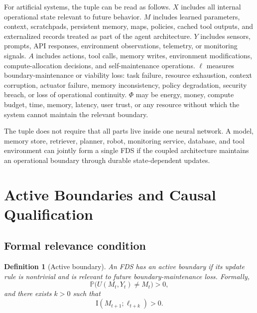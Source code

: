 \documentclass[10pt,a4paper,twocolumn,aps,prl]{revtex4-2}
\newtheorem{definition}{Definition}
\newcommand{\Prob}{\mathbb{P}}
\newcommand{\MI}{\mathrm{I}}
\begin{document}
For artificial systems, the tuple can be read as follows. $X$ includes all internal operational state relevant to future behavior. $M$ includes learned parameters, context, scratchpads, persistent memory, maps, policies, cached tool outputs, and externalized records treated as part of the agent architecture. $Y$ includes sensors, prompts, API responses, environment observations, telemetry, or monitoring signals. $A$ includes actions, tool calls, memory writes, environment modifications, compute-allocation decisions, and self-maintenance operations. $\ell$ measures boundary-maintenance or viability loss: task failure, resource exhaustion, context corruption, actuator failure, memory inconsistency, policy degradation, security breach, or loss of operational continuity. $\Phi$ may be energy, money, compute budget, time, memory, latency, user trust, or any resource without which the system cannot maintain the relevant boundary.

The tuple does not require that all parts live inside one neural network. A model, memory store, retriever, planner, robot, monitoring service, database, and tool environment can jointly form a single FDS if the coupled architecture maintains an operational boundary through durable state-dependent updates.

\section{Active Boundaries and Causal Qualification}

\subsection{Formal relevance condition}

\begin{definition}[Active boundary]
An FDS has an active boundary if its update rule is nontrivial and is relevant to future boundary-maintenance loss. Formally,
\begin{equation}
\Prob\big(U(M_t,Y_t)\neq M_t\big)>0,
\label{eq:nontrivial-update}
\end{equation}
and there exists $k>0$ such that
\begin{equation}
\MI(M_{t+1};\ell_{t+k})>0.
\label{eq:mi-relevance}
\end{equation}
\end{definition}
\end{document}
